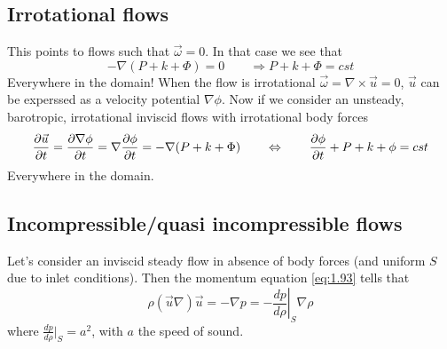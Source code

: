 	\subsection{Irrotational flows}
		This points to flows such that $\vec{\omega} = 0$. In that case we see that 
		\begin{equation}
			-\nabla (P+k+\Phi) = 0 \qquad \Rightarrow P+k+\Phi = cst 
		\end{equation}
		Everywhere in the domain! When the flow is irrotational $\vec{\omega} = \nabla \times \vec{u} = 0$, $\vec{u}$ can be experssed as a velocity potential $\nabla \phi$. Now if we consider an unsteady, barotropic, irrotational inviscid flows with irrotational body forces 
		\begin{equation}
			\frac{\D \vec{u}}{\D t} = \frac{\D \nabla \phi}{\D t} = \nabla \frac{\D \phi }{\D t} = -\nabla (P+k+\Phi) \qquad \Leftrightarrow \qquad \frac{\D \phi}{\D t} + P + k +\phi = cst 
		\end{equation}
		Everywhere in the domain. 
		
	\subsection{Incompressible/quasi incompressible flows}
		Let's consider an inviscid steady flow in absence of body forces (and uniform $S$ due to inlet conditions). Then the momentum equation \eqref{eq:1.93} tells that
		\begin{equation}
			\rho (\vec{u}\nabla )\vec{u} = -\nabla p  = - \left.\frac{dp}{d\rho}\right|_{S} \nabla \rho 
		\end{equation}
		where $\frac{dp}{d\rho}|_S = a^2$, with $a$ the speed of sound. 
		

